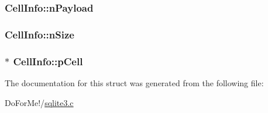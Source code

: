 \hypertarget{struct_cell_info_ac1e3c1b4216a8e778bbac82907bb1485}{
\subsubsection[{n\-Payload}]{ Cell\-Info\-::n\-Payload}}\label{struct_cell_info_ac1e3c1b4216a8e778bbac82907bb1485}
\hypertarget{struct_cell_info_ace78ab5eb5337b686e31b895feeb0562}{
\subsubsection[{n\-Size}]{ Cell\-Info\-::n\-Size}}\label{struct_cell_info_ace78ab5eb5337b686e31b895feeb0562}
\hypertarget{struct_cell_info_a595ed7eeb60ea274d868f24347b7238e}{
\subsubsection[{p\-Cell}]{$\ast$ Cell\-Info\-::p\-Cell}}\label{struct_cell_info_a595ed7eeb60ea274d868f24347b7238e}


The documentation for this struct was generated from the following file\-:\begin{DoxyCompactItemize}
\item 
Do\-For\-Me!/\hyperlink{sqlite3_8c}{sqlite3.\-c}\end{DoxyCompactItemize}

